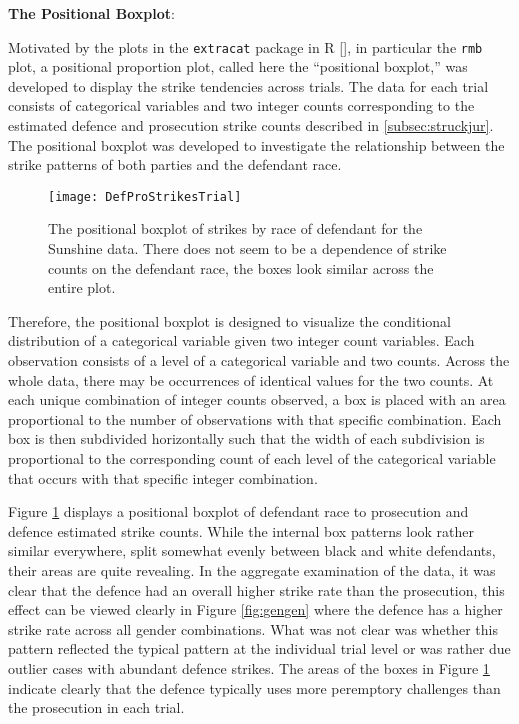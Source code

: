\textbf{The Positional Boxplot}:

Motivated by the plots in the \texttt{extracat} package in R [\cite{extracat}], in particular the \texttt{rmb} plot, a
positional proportion plot, called here the ``positional boxplot,'' was developed to display the strike tendencies across
trials. The data for each trial consists of categorical variables and two integer counts corresponding to the estimated defence
and prosecution strike counts described in \ref{subsec:struckjur}. The positional boxplot was developed to investigate the
relationship between the strike patterns of both parties and the defendant race.

\begin{figure}[h!]
  \centering
  \texttt{[image: DefProStrikesTrial]}
  \caption[Prosecution and Defence Strikes by Trial]{\footnotesize The positional boxplot of strikes by race of defendant for the
    Sunshine data. There does not seem to be a dependence of strike counts on the defendant race, the boxes look similar across
    the entire plot.}
  \label{fig:trialprodef}
\end{figure}

Therefore, the positional boxplot is designed to visualize the conditional distribution of a categorical variable given two
integer count variables. Each observation consists of a level of a categorical variable and two counts. Across the whole data,
there may be occurrences of identical values for the two counts. At each unique combination of integer counts observed, a box is
placed with an area proportional to the number of observations with that specific combination. Each box is then subdivided
horizontally such that the width of each subdivision is proportional to the corresponding count of each level of the categorical
variable that occurs with that specific integer combination.

Figure \ref{fig:trialprodef} displays a positional boxplot of defendant race to prosecution and defence estimated strike
counts. While the internal box patterns look rather similar everywhere, split somewhat evenly between black and white defendants,
their areas are quite revealing. In the aggregate examination of the data, it was clear that the defence had an overall higher
strike rate than the prosecution, this effect can be viewed clearly in Figure \ref{fig:gengen} where the defence has a higher
strike rate across all gender combinations. What was not clear was whether this pattern reflected the typical pattern at the
individual trial level or was rather due outlier cases with abundant defence strikes. The areas of the boxes in Figure
\ref{fig:trialprodef} indicate clearly that the defence typically uses more peremptory challenges than the prosecution in each
trial.

